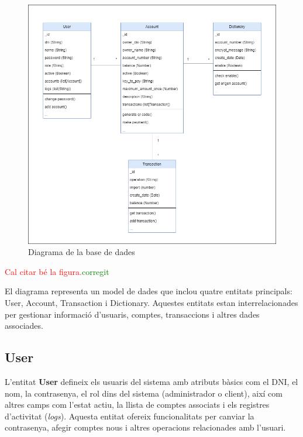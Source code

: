 \documentclass[a4paper,12pt,twoside]{ThesisStyle}
\newcommand{\pau}[1]{\textcolor{red}{#1}}
\newcommand{\sudan}[1]{\textcolor{green}{#1}}
\begin{document}
\begin{figure}[h]
    \centering
    \includegraphics[width=1\textwidth]{imatges/diagrama base dades.png}
    \caption{Diagrama de la base de dades}
    \label{fig: Diagrama de base de dades}
\end{figure}

\pau{Cal citar bé la figura.}\sudan{corregit}

El diagrama representa un model de dades que inclou quatre entitats principals: User, Account, Transaction i Dictionary. Aquestes entitats estan interrelacionades per gestionar informació d'usuaris, comptes, transaccions i altres dades associades.

\subsection{User}
\label{subsec: User}


L'entitat \textbf{User} defineix els usuaris del sistema amb atributs bàsics com el DNI, el nom, la contrasenya, el rol dins del sistema (administrador o client), així com altres camps com l'estat actiu, la llista de comptes associats i els registres d'activitat (\textit{logs}). Aquesta entitat ofereix funcionalitats per canviar la contrasenya, afegir comptes nous i altres operacions relacionades amb l'usuari.\\
\end{document}
